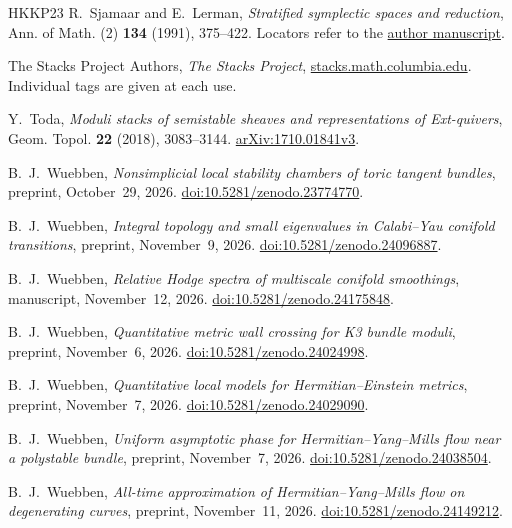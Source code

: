\begin{thebibliography}{HKKP23}
R.~Sjamaar and E.~Lerman, \emph{Stratified symplectic spaces and reduction},
Ann. of Math. (2) \textbf{134} (1991), 375--422.
Locators refer to the
\href{https://people.maths.ox.ac.uk/beem/papers/symplectic_stratified_spaces.pdf}
{author manuscript}.

The Stacks Project Authors, \emph{The Stacks Project},
\href{https://stacks.math.columbia.edu}{stacks.math.columbia.edu}.
Individual tags are given at each use.

Y.~Toda, \emph{Moduli stacks of semistable sheaves and representations
of Ext-quivers}, Geom. Topol. \textbf{22} (2018), 3083--3144.
\href{https://arxiv.org/abs/1710.01841v3}{arXiv:1710.01841v3}.

B.~J.~Wuebben,
\emph{Nonsimplicial local stability chambers of toric tangent bundles},
preprint, October~29, 2026.
\href{https://doi.org/10.5281/zenodo.23774770}
{doi:10.5281/zenodo.23774770}.

B.~J.~Wuebben,
\emph{Integral topology and small eigenvalues in Calabi--Yau conifold
transitions}, preprint, November~9, 2026.
\href{https://doi.org/10.5281/zenodo.24096887}
{doi:10.5281/zenodo.24096887}.

B.~J.~Wuebben,
\emph{Relative Hodge spectra of multiscale conifold smoothings},
manuscript, November~12, 2026.
\href{https://doi.org/10.5281/zenodo.24175848}{doi:10.5281/zenodo.24175848}.

B.~J.~Wuebben,
\emph{Quantitative metric wall crossing for K3 bundle moduli},
preprint, November~6, 2026.
\href{https://doi.org/10.5281/zenodo.24024998}
{doi:10.5281/zenodo.24024998}.

B.~J.~Wuebben, \emph{Quantitative local models for Hermitian--Einstein metrics},
preprint, November~7, 2026.
\href{https://doi.org/10.5281/zenodo.24029090}{doi:10.5281/zenodo.24029090}.

B.~J.~Wuebben, \emph{Uniform asymptotic phase for Hermitian--Yang--Mills
flow near a polystable bundle}, preprint, November~7, 2026.
\href{https://doi.org/10.5281/zenodo.24038504}{doi:10.5281/zenodo.24038504}.

B.~J.~Wuebben, \emph{All-time approximation of Hermitian--Yang--Mills
flow on degenerating curves}, preprint, November~11, 2026.
\href{https://doi.org/10.5281/zenodo.24149212}{doi:10.5281/zenodo.24149212}.

\end{thebibliography}
